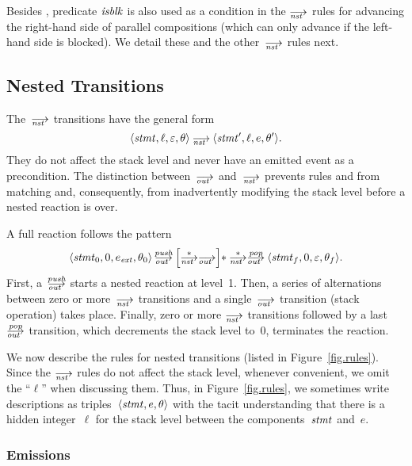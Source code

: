 Besides , predicate $\mathop{\mathit{isblk}}$ is also used as a condition in the
$\nst$ rules for advancing the right-hand side of parallel compositions
(which can only advance if the left-hand side is blocked).  We detail these
and the other~$\nst$ rules next.




\subsection{Nested Transitions}
\label{sec.sem.nested}

The~$\nst$ transitions have the general form
\[
\<\stmt,\ell,\nil,\theta>\nst\<\stmt',\ell,e,\theta'>.
\]
They do not affect the stack level and never have an emitted event as a
precondition.  The distinction between~$\out$ and~$\nst$ prevents rules
 and  from matching and, consequently, from inadvertently
modifying the stack level before a nested reaction is over.

A full reaction follows the pattern
\begin{align*}
  \<\stmt_0,0,e_\ext,\theta_0>\outpush
  {\Big[{\nst[*]}{\out}\Big]{*}}
  \null\mathbin{\nst[*]\outpop}\<\stmt_f,0,\nil,\theta_f>.
\end{align*}
First, a~$\outpush$ starts a nested reaction at level~1.  Then, a series of
alternations between zero or more~$\nst$ transitions and a single~$\out$
transition (stack operation) takes place.  Finally, zero or more $\nst$
transitions followed by a last~$\outpop$ transition, which decrements the
stack level to~0, terminates the reaction.

We now describe the rules for nested transitions (listed in
Figure~\ref{fig.rules}).  Since the $\nst$ rules do not affect the stack
level, whenever convenient, we omit the ``$\ell$'' when discussing them.
Thus, in Figure~\ref{fig.rules}, we sometimes write descriptions as
triples~$\<\stmt,e,\theta>$ with the tacit understanding that there is a
hidden integer~$\ell$ for the stack level between the components~$\mathit{stmt}$
and~$e$.

\subsubsection*{Emissions}

